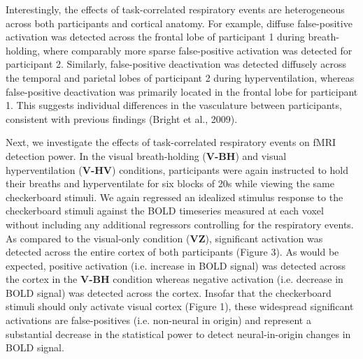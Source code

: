 \documentclass[9pt]{NEU502b-fmri}
\begin{document}
Interestingly, the effects of task-correlated respiratory events are heterogeneous across both participants and cortical anatomy. For example, diffuse false-positive activation was detected across the frontal lobe of participant 1 during breath-holding, where comparably more sparse  false-positive activation was detected for participant 2. Similarly, false-positive deactivation was detected diffusely across the temporal and parietal lobes of participant 2 during hyperventilation, whereas false-positive deactivation was primarily located in the frontal lobe for participant 1. This suggests individual differences in the vasculature between participants, consistent with previous findings (Bright et al., 2009). 

Next, we investigate the effects of task-correlated respiratory events on fMRI detection power.  In the visual breath-holding (\textbf{V-BH}) and visual hyperventilation (\textbf{V-HV}) conditions, participants were again instructed to hold their breaths and hyperventilate for six blocks of 20s while viewing the same checkerboard stimuli. We again regressed an idealized stimulus response to the checkerboard stimuli against the BOLD timeseries measured at each voxel without including any additional regressors controlling for the respiratory events. As compared to the visual-only condition (\textbf{VZ}), significant activation was detected across the entire cortex of both participants (Figure 3). As would be expected, positive activation (i.e. increase in BOLD signal) was detected across the cortex in the \textbf{V-BH} condition whereas negative activation (i.e. decrease in BOLD signal) was detected across the cortex. Insofar that the checkerboard stimuli should only activate visual cortex (Figure 1), these widespread significant activations are false-positives (i.e. non-neural in origin) and represent a substantial decrease in the statistical power to detect neural-in-origin changes in BOLD signal. 
\end{document}
